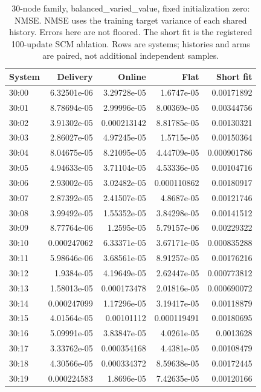 \begin{table}[ht]
\centering\scriptsize
\begin{tabular}{lrrrr}
\toprule
System & Delivery & Online & Flat & Short fit\\
\midrule
30:00 & 6.32501e-06 & 3.29728e-05 & 1.6747e-05 & 0.00171892\\
30:01 & 8.78694e-05 & 2.99996e-05 & 8.00369e-05 & 0.00344756\\
30:02 & 3.91302e-05 & 0.000213142 & 8.81785e-05 & 0.00130321\\
30:03 & 2.86027e-05 & 4.97245e-05 & 1.5715e-05 & 0.00150364\\
30:04 & 8.04675e-05 & 8.21095e-05 & 4.44709e-05 & 0.000901786\\
30:05 & 4.94633e-05 & 3.71104e-05 & 4.53336e-05 & 0.00104716\\
30:06 & 2.93002e-05 & 3.02482e-05 & 0.000110862 & 0.00180917\\
30:07 & 2.87392e-05 & 2.41507e-05 & 4.8687e-05 & 0.00121746\\
30:08 & 3.99492e-05 & 1.55352e-05 & 3.84298e-05 & 0.00141512\\
30:09 & 8.77764e-06 & 1.2595e-05 & 5.79157e-06 & 0.00229322\\
30:10 & 0.000247062 & 6.33371e-05 & 3.67171e-05 & 0.000835288\\
30:11 & 5.98646e-06 & 3.68561e-05 & 8.91257e-05 & 0.00176216\\
30:12 & 1.9384e-05 & 4.19649e-05 & 2.62447e-05 & 0.000773812\\
30:13 & 1.58013e-05 & 0.000173478 & 2.01816e-05 & 0.000690072\\
30:14 & 0.000247099 & 1.17296e-05 & 3.19417e-05 & 0.00118879\\
30:15 & 4.01564e-05 & 0.00101112 & 0.000119491 & 0.00180695\\
30:16 & 5.09991e-05 & 3.83847e-05 & 4.0261e-05 & 0.0013628\\
30:17 & 3.33762e-05 & 0.000354168 & 4.4381e-05 & 0.00108479\\
30:18 & 4.30566e-05 & 0.000334372 & 8.59638e-05 & 0.00172445\\
30:19 & 0.000224583 & 1.8696e-05 & 7.42635e-05 & 0.00120166\\
\bottomrule
\end{tabular}
\caption{30-node family, balanced\_varied\_value, fixed initialization zero: NMSE. NMSE uses the training target variance of each shared history. Errors here are not floored. The short fit is the registered 100-update SCM ablation. Rows are systems; histories and arms are paired, not additional independent samples.}
\end{table}
